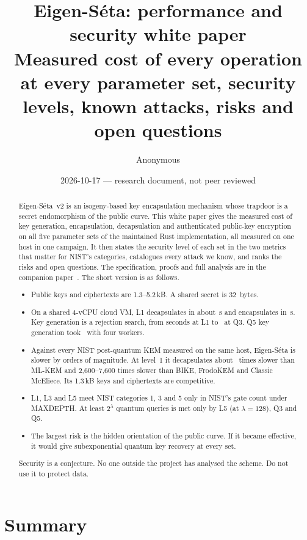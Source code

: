 \documentclass[11pt,a4paper]{article}
\title{Eigen-S\'eta: performance and security white paper\\[0.3em]
\large Measured cost of every operation at every parameter set, security
levels, known attacks, risks and open questions}
\author{Anonymous}
\date{2026-10-17 --- research document, not peer reviewed}
\begin{document}
\maketitle

\begin{abstract}
Eigen-S\'eta~v2 is an isogeny-based key encapsulation mechanism whose
trapdoor is a secret endomorphism of the public curve. This white paper
gives the measured cost of key generation, encapsulation, decapsulation and
authenticated public-key encryption on all five parameter sets of the
maintained Rust implementation, all measured on one host in one campaign.
It then states the security level of each set in the two metrics that
matter for NIST's categories, catalogues every attack we know, and ranks
the risks and open questions. The specification, proofs and full analysis
are in the companion paper~\cite{EigenSetaPaper}. The short version is as
follows.
\begin{itemize}[nosep]
\item Public keys and ciphertexts are 1.3--5.2\,kB. A shared secret is
  32~bytes.
\item On a shared 4-vCPU cloud VM, L1 decapsulates in about \DecLOne\,s and
  encapsulates in \EncLOne\,s. Key generation is a rejection search, from
  seconds at L1 to \KgQThree\ at Q3. Q5 key generation took \KgQFive\ with four workers.
\item Against every NIST post-quantum KEM measured on the same host,
  Eigen-S\'eta is slower by orders of magnitude. At level~1 it decapsulates
  about \RatioDecLOne\ times slower than ML-KEM and 2,600--7,600 times
  slower than BIKE, FrodoKEM and Classic McEliece. Its 1.3\,kB keys and
  ciphertexts are competitive.
\item L1, L3 and L5 meet NIST categories 1, 3 and 5 only in NIST's gate
  count under MAXDEPTH. At least $2^\lambda$ quantum queries is met only by
  L5 (at $\lambda=128$), Q3 and Q5.
\item The largest risk is the hidden orientation of the public curve. If it
  became effective, it would give subexponential quantum key recovery at
  every set.
\end{itemize}
Security is a conjecture. No one outside the project has analysed the
scheme. Do not use it to protect data.
\end{abstract}

\tableofcontents

\section{Summary}\label{sec:summary}
\end{document}
